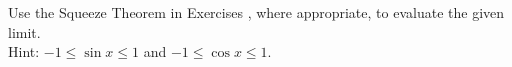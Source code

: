 {Use the Squeeze Theorem in Exercises}
{, where appropriate, to evaluate the given limit.\\
Hint: $-1\leq \sin x\leq 1$ and $-1\leq \cos x\leq 1$.}
